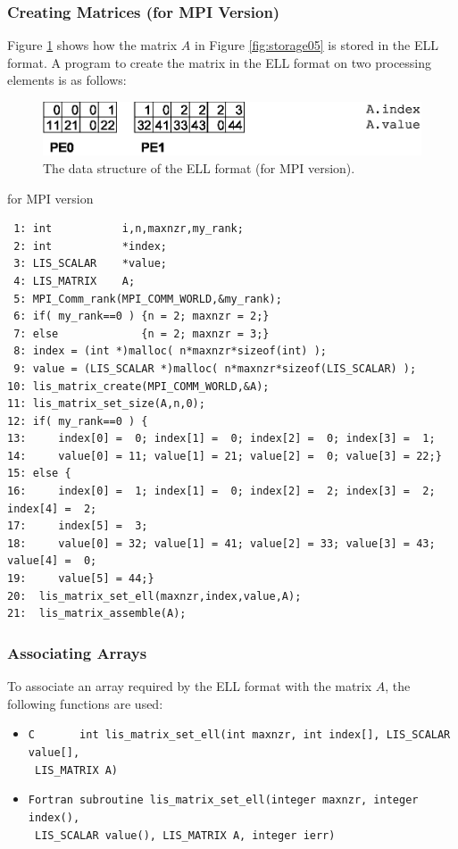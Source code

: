 \documentclass[a4paper]{article}
\begin{document}
\subsubsection{Creating Matrices (for MPI Version)}
Figure \ref{fig:storage05_mpi} shows how the matrix $A$ in Figure \ref{fig:storage05} is stored in the ELL format. A program to create the matrix in the ELL format on two processing elements is as follows:
\begin{figure}[h]
{\centering 
\includegraphics{storage05_mpi.eps} 
\caption{The data structure of the ELL format (for MPI version).}\label{fig:storage05_mpi}}
\end{figure}
\begin{itembox}[l]{for MPI version}
\small
\begin{verbatim}
 1: int           i,n,maxnzr,my_rank;
 2: int           *index;
 3: LIS_SCALAR    *value;
 4: LIS_MATRIX    A;
 5: MPI_Comm_rank(MPI_COMM_WORLD,&my_rank);
 6: if( my_rank==0 ) {n = 2; maxnzr = 2;}
 7: else             {n = 2; maxnzr = 3;}
 8: index = (int *)malloc( n*maxnzr*sizeof(int) );
 9: value = (LIS_SCALAR *)malloc( n*maxnzr*sizeof(LIS_SCALAR) );
10: lis_matrix_create(MPI_COMM_WORLD,&A);
11: lis_matrix_set_size(A,n,0);
12: if( my_rank==0 ) {
13:     index[0] =  0; index[1] =  0; index[2] =  0; index[3] =  1;
14:     value[0] = 11; value[1] = 21; value[2] =  0; value[3] = 22;}
15: else {
16:     index[0] =  1; index[1] =  0; index[2] =  2; index[3] =  2; index[4] =  2;
17:     index[5] =  3;
18:     value[0] = 32; value[1] = 41; value[2] = 33; value[3] = 43; value[4] =  0;
19:     value[5] = 44;}
20:  lis_matrix_set_ell(maxnzr,index,value,A);
21:  lis_matrix_assemble(A);
\end{verbatim}
\end{itembox}
\subsubsection{Associating Arrays}
To associate an array required by the ELL format with the matrix $A$, the following functions are used:
\begin{itemize}
\item \verb|C       int lis_matrix_set_ell(int maxnzr, int index[], LIS_SCALAR value[],|\\
      \verb| LIS_MATRIX A)|
\item \verb|Fortran subroutine lis_matrix_set_ell(integer maxnzr, integer index(),|\\
      \verb| LIS_SCALAR value(), LIS_MATRIX A, integer ierr)|
\end{itemize}
\end{document}
